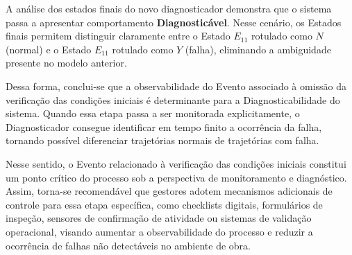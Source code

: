 A análise dos estados finais do novo diagnosticador demonstra que o sistema passa a apresentar comportamento \textbf{Diagnosticável}. Nesse cenário, os Estados finais permitem distinguir claramente entre o Estado $E_{11}$ rotulado como $N$ (normal) e o Estado $E_{11}$ rotulado como $Y$ (falha), eliminando a ambiguidade presente no modelo anterior.

Dessa forma, conclui-se que a observabilidade do Evento associado à omissão da verificação das condições iniciais é determinante para a Diagnosticabilidade do sistema. Quando essa etapa passa a ser monitorada explicitamente, o Diagnosticador consegue identificar em tempo finito a ocorrência da falha, tornando possível diferenciar trajetórias normais de trajetórias com falha.

Nesse sentido, o Evento relacionado à verificação das condições iniciais constitui um ponto crítico do processo sob a perspectiva de monitoramento e diagnóstico. Assim, torna-se recomendável que gestores adotem mecanismos adicionais de controle para essa etapa específica, como checklists digitais, formulários de inspeção, sensores de confirmação de atividade ou sistemas de validação operacional, visando aumentar a observabilidade do processo e reduzir a ocorrência de falhas não detectáveis no ambiente de obra.




